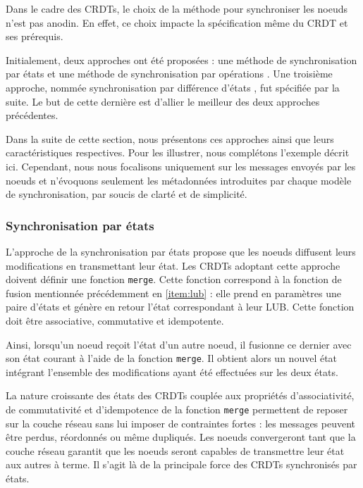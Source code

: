 \documentclass[12pt]{thesul}
\begin{document}
Dans le cadre des \acp{CRDT}, le choix de la méthode pour synchroniser les noeuds n'est pas anodin.
En effet, ce choix impacte la spécification même du \ac{CRDT} et ses prérequis.

Initialement, deux approches ont été proposées : une méthode de synchronisation par états \cite{shapiro_2011_crdt, shapiro:inria-00555588} et une méthode de synchronisation par opérations \cite{shapiro_2011_crdt, shapiro:inria-00555588, 2014-making-op-based-crdts-op-based, baquero2017pure}.
Une troisième approche, nommée synchronisation par différence d'états \cite{almeida2015delta, Almeida_2018}, fut spécifiée par la suite.
Le but de cette dernière est d'allier le meilleur des deux approches précédentes.

Dans la suite de cette section, nous présentons ces approches ainsi que leurs caractéristiques respectives.
Pour les illustrer, nous complétons l'exemple décrit ici.
Cependant, nous nous focalisons uniquement sur les messages envoyés par les noeuds et n'évoquons seulement les métadonnées introduites par chaque modèle de synchronisation, par soucis de clarté et de simplicité.

\subsubsection{Synchronisation par états}

L'approche de la synchronisation par états propose que les noeuds diffusent leurs modifications en transmettant leur état.
Les \acp{CRDT} adoptant cette approche doivent définir une fonction \texttt{merge}.
Cette fonction correspond à la fonction de fusion mentionnée précédemment en \ref{item:lub} : elle prend en paramètres une paire d'états et génère en retour l'état correspondant à leur \ac{LUB}.
Cette fonction doit être associative, commutative et idempotente.

Ainsi, lorsqu'un noeud reçoit l'état d'un autre noeud, il fusionne ce dernier avec son état courant à l'aide de la fonction \texttt{merge}.
Il obtient alors un nouvel état intégrant l'ensemble des modifications ayant été effectuées sur les deux états.

La nature croissante des états des \acp{CRDT} couplée aux propriétés d'associativité, de commutativité et d'idempotence de la fonction \texttt{merge} permettent de reposer sur la couche réseau sans lui imposer de contraintes fortes : les messages peuvent être perdus, réordonnés ou même dupliqués.
Les noeuds convergeront tant que la couche réseau garantit que les noeuds seront capables de transmettre leur état aux autres à terme.
Il s'agit là de la principale force des \acp{CRDT} synchronisés par états.
\end{document}

